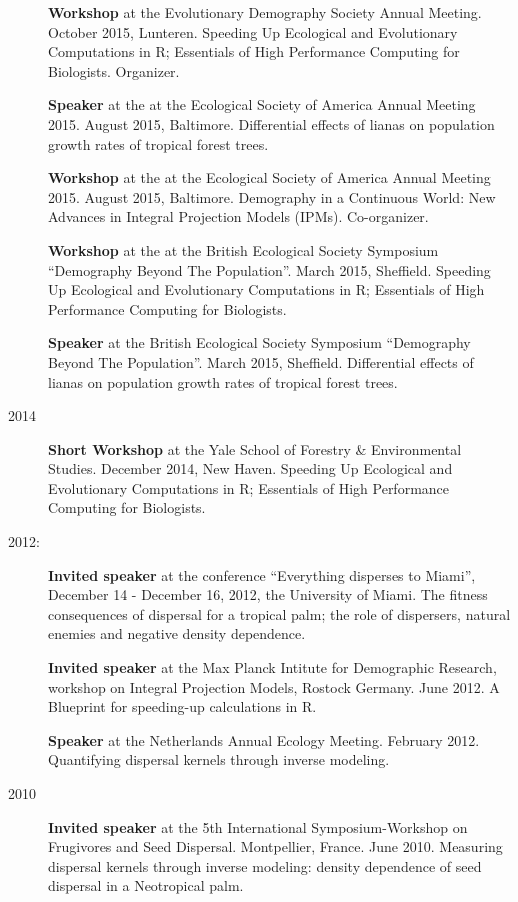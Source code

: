 \documentclass[b5paper,justified]{tufte-book} %
\begin{document}
\begin{fullwidth}
\begin{description}
\textbf{Workshop} at the Evolutionary Demography Society Annual Meeting.
October 2015, Lunteren. Speeding Up Ecological and Evolutionary
Computations in R; Essentials of High Performance Computing for
Biologists. Organizer.

\textbf{Speaker} at the at the Ecological Society of America Annual
Meeting 2015. August 2015, Baltimore. Differential effects of lianas on
population growth rates of tropical forest trees.

\textbf{Workshop} at the at the Ecological Society of America Annual
Meeting 2015. August 2015, Baltimore. Demography in a Continuous World:
New Advances in Integral Projection Models (IPMs). Co-organizer.

\textbf{Workshop} at the at the British Ecological Society Symposium
``Demography Beyond The Population''. March 2015, Sheffield. Speeding Up
Ecological and Evolutionary Computations in R; Essentials of High
Performance Computing for Biologists.

\textbf{Speaker} at the British Ecological Society Symposium
``Demography Beyond The Population''. March 2015, Sheffield.
Differential effects of lianas on population growth rates of tropical
forest trees.
\item[2014]
\textbf{Short Workshop} at the Yale School of Forestry \& Environmental
Studies. December 2014, New Haven. Speeding Up Ecological and
Evolutionary Computations in R; Essentials of High Performance Computing
for Biologists.
\item[2012:]
\textbf{Invited speaker} at the conference ``Everything disperses to
Miami'', December 14 - December 16, 2012, the University of Miami. The
fitness consequences of dispersal for a tropical palm; the role of
dispersers, natural enemies and negative density dependence.

\textbf{Invited speaker} at the Max Planck Intitute for Demographic
Research, workshop on Integral Projection Models, Rostock Germany. June
2012. A Blueprint for speeding-up calculations in R.

\textbf{Speaker} at the Netherlands Annual Ecology Meeting. February
2012. Quantifying dispersal kernels through inverse modeling.
\item[2010]
\textbf{Invited speaker} at the 5th International Symposium-Workshop on
Frugivores and Seed Dispersal. Montpellier, France. June 2010. Measuring
dispersal kernels through inverse modeling: density dependence of seed
dispersal in a Neotropical palm.


\end{description}
\end{fullwidth}
\end{document}
